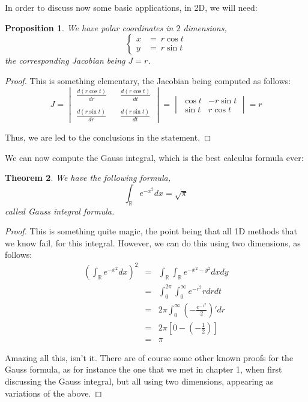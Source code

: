 \documentclass[12pt]{amsbook}
\newtheorem{theorem}{Theorem}[chapter]
\newtheorem{proposition}[theorem]{Proposition}
\begin{document}
In order to discuss now some basic applications, in 2D, we will need:

\begin{proposition}
We have polar coordinates in $2$ dimensions,
$$\begin{cases}
x\!\!\!&=\ r\cos t\\
y\!\!\!&=\ r\sin t
\end{cases}$$
the corresponding Jacobian being $J=r$.
\end{proposition}

\begin{proof}
This is something elementary, the Jacobian being computed as follows:
$$J
=\begin{vmatrix}
\frac{d(r\cos t)}{dr}&&\frac{d(r\cos t)}{dt}\\
\\
\frac{d(r\sin t)}{dr}&&\frac{d(r\sin t)}{dt}
\end{vmatrix}
=\begin{vmatrix}
\cos t&-r\sin t\\
\sin t&r\cos t
\end{vmatrix}
=r$$

Thus, we are led to the conclusions in the statement.
\end{proof}

We can now compute the Gauss integral, which is the best calculus formula ever:

\begin{theorem}
We have the following formula,
$$\int_\mathbb Re^{-x^2}dx=\sqrt{\pi}$$
called Gauss integral formula.
\end{theorem}

\begin{proof}
This is something quite magic, the point being that all 1D methods that we know fail, for this integral. However, we can do this using two dimensions, as follows:
\begin{eqnarray*}
\left(\int_\mathbb Re^{-x^2}dx\right)^2
&=&\int_\mathbb R\int_\mathbb Re^{-x^2-y^2}dxdy\\
&=&\int_0^{2\pi}\int_0^\infty e^{-r^2}rdrdt\\
&=&2\pi\int_0^\infty\left(-\frac{e^{-r^2}}{2}\right)'dr\\
&=&2\pi\left[0-\left(-\frac{1}{2}\right)\right]\\
&=&\pi
\end{eqnarray*}

Amazing all this, isn't it. There are of course some other known proofs for the Gauss formula, as for instance the one that we met in chapter 1, when first discussing the Gauss integral, but all using two dimensions, appearing as variations of the above.
\end{proof}
\end{document}
